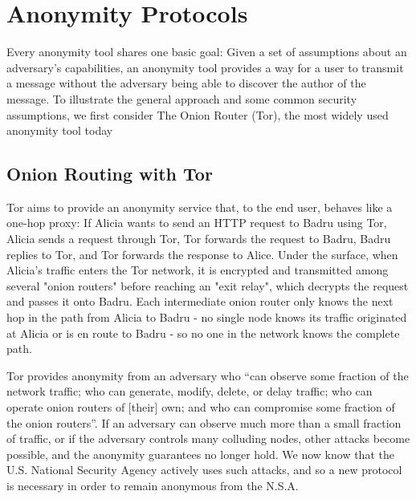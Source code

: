 \section{Anonymity Protocols}
\label{subsection:ExistingAnonymity}
  Every anonymity tool shares one basic goal: Given a set of assumptions about
  an adversary's capabilities, an anonymity tool provides a way for a user to
  transmit a message without the adversary being able to discover the author
  of the message.  To illustrate the general approach and some common
  security assumptions, we first consider The Onion Router (Tor), the most
  widely used anonymity tool today\cite{ford_hiding_2014}

  \subsection{Onion Routing with Tor}
    Tor aims to provide an anonymity service that, to the end user, behaves like
    a one-hop proxy: If Alicia wants to send an HTTP request to Badru using Tor,
    Alicia sends a request through Tor, Tor forwards the request to Badru, Badru
    replies to Tor, and Tor forwards the response to Alice. Under the surface,
    when Alicia's traffic enters the Tor network, it is encrypted and
    transmitted among several "onion routers" before reaching an "exit relay",
    which decrypts the request and passes it onto Badru. Each intermediate onion
    router only knows the next hop in the path from Alicia to Badru - no single
    node knows its traffic originated at Alicia or is en route to Badru - so no
    one in the network knows the complete path.

    Tor provides anonymity from an adversary who ``can observe some fraction of
    the network traffic; who can generate, modify, delete, or delay traffic; who
    can operate onion routers of [their] own; and who can compromise some
    fraction of the onion routers''\cite{dingledine_tor:_2004}. If an adversary
    can observe much more than a small fraction of traffic, or if the adversary
    controls many colluding nodes, other attacks become possible, and the
    anonymity guarantees no longer hold. We now know that the U.S. National
    Security Agency actively uses such attacks, and so a new protocol is
    necessary in order to remain anonymous from the N.S.A.

